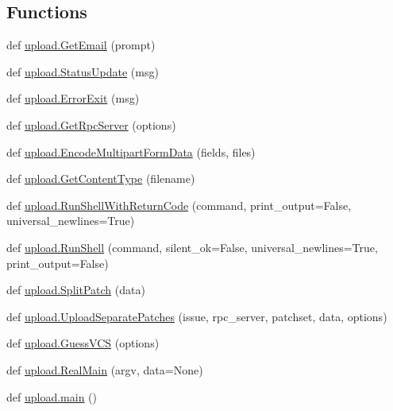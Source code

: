 \subsection*{Functions}
\begin{DoxyCompactItemize}
\item 
def \mbox{\hyperlink{namespaceupload_a4f169469a6d43221ebd38cfd546484e1}{upload.\+Get\+Email}} (prompt)
\item 
def \mbox{\hyperlink{namespaceupload_a79ce84c196c018f3b0c7ff7a9b626b58}{upload.\+Status\+Update}} (msg)
\item 
def \mbox{\hyperlink{namespaceupload_adea53186a1d73e92cc839b7c35c2c044}{upload.\+Error\+Exit}} (msg)
\item 
def \mbox{\hyperlink{namespaceupload_a1dadef480a702dbc5d0fb66203b9abe7}{upload.\+Get\+Rpc\+Server}} (options)
\item 
def \mbox{\hyperlink{namespaceupload_ae12985a2c860c124c502dd2099b702eb}{upload.\+Encode\+Multipart\+Form\+Data}} (fields, files)
\item 
def \mbox{\hyperlink{namespaceupload_a753a004706d964335ad218628e07b063}{upload.\+Get\+Content\+Type}} (filename)
\item 
def \mbox{\hyperlink{namespaceupload_afa542d3a5a4f4fce174a1c23644a9204}{upload.\+Run\+Shell\+With\+Return\+Code}} (command, print\+\_\+output=False, universal\+\_\+newlines=True)
\item 
def \mbox{\hyperlink{namespaceupload_adddc423c49132e8879cbb25d6be2cf11}{upload.\+Run\+Shell}} (command, silent\+\_\+ok=False, universal\+\_\+newlines=True, print\+\_\+output=False)
\item 
def \mbox{\hyperlink{namespaceupload_a9dd260785ca4cc97e245234811ef1949}{upload.\+Split\+Patch}} (data)
\item 
def \mbox{\hyperlink{namespaceupload_a7ec83cb7f7bfb9109c19b6f91552b3ee}{upload.\+Upload\+Separate\+Patches}} (issue, rpc\+\_\+server, patchset, data, options)
\item 
def \mbox{\hyperlink{namespaceupload_a31390568253accd22ee51861eaeb99bd}{upload.\+Guess\+V\+CS}} (options)
\item 
def \mbox{\hyperlink{namespaceupload_ad6226af96c9f1905602b8002bd5de952}{upload.\+Real\+Main}} (argv, data=None)
\item 
def \mbox{\hyperlink{namespaceupload_aef3fcf7a8d77d13ba75adbf58b6c43ee}{upload.\+main}} ()
\end{DoxyCompactItemize}
